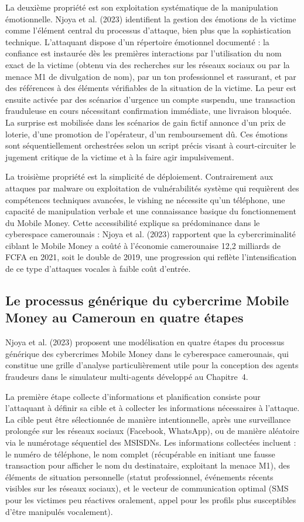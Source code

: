 \documentclass[11pt,a4paper,oneside]{report}
\theoremstyle{definition}
\theoremstyle{remark}
\begin{document}
La deuxième propriété est son exploitation systématique de la manipulation émotionnelle. Njoya et al. (2023) identifient la gestion des émotions de la victime comme l'élément central du processus d'attaque, bien plus que la sophistication technique. L'attaquant dispose d'un répertoire émotionnel documenté : la confiance est instaurée dès les premières interactions par l'utilisation du nom exact de la victime (obtenu via des recherches sur les réseaux sociaux ou par la menace M1 de divulgation de nom), par un ton professionnel et rassurant, et par des références à des éléments vérifiables de la situation de la victime. La peur est ensuite activée par des scénarios d'urgence  un compte suspendu, une transaction frauduleuse en cours nécessitant confirmation immédiate, une livraison bloquée. La surprise est mobilisée dans les scénarios de gain fictif  annonce d'un prix de loterie, d'une promotion de l'opérateur, d'un remboursement dû. Ces émotions sont séquentiellement orchestrées selon un script précis visant à court-circuiter le jugement critique de la victime et à la faire agir impulsivement.

La troisième propriété est la simplicité de déploiement. Contrairement aux attaques par malware ou exploitation de vulnérabilités système qui requièrent des compétences techniques avancées, le vishing ne nécessite qu'un téléphone, une capacité de manipulation verbale et une connaissance basique du fonctionnement du Mobile Money. Cette accessibilité explique sa prédominance dans le cyberespace camerounais : Njoya et al. (2023) rapportent que la cybercriminalité ciblant le Mobile Money a coûté à l'économie camerounaise 12,2 milliards de FCFA en 2021, soit le double de 2019, une progression qui reflète l'intensification de ce type d'attaques vocales à faible coût d'entrée.

\subsection{Le processus générique du cybercrime Mobile Money au Cameroun en quatre étapes}

Njoya et al. (2023) proposent une modélisation en quatre étapes du processus générique des cybercrimes Mobile Money dans le cyberespace camerounais, qui constitue une grille d'analyse particulièrement utile pour la conception des agents fraudeurs dans le simulateur multi-agents développé au Chapitre~4.

La première étape  collecte d'informations et planification  consiste pour l'attaquant à définir sa cible et à collecter les informations nécessaires à l'attaque. La cible peut être sélectionnée de manière intentionnelle, après une surveillance prolongée sur les réseaux sociaux (Facebook, WhatsApp), ou de manière aléatoire via le numérotage séquentiel des MSISDNs. Les informations collectées incluent : le numéro de téléphone, le nom complet (récupérable en initiant une fausse transaction pour afficher le nom du destinataire, exploitant la menace M1), des éléments de situation personnelle (statut professionnel, événements récents visibles sur les réseaux sociaux), et le vecteur de communication optimal (SMS pour les victimes peu réactives oralement, appel pour les profils plus susceptibles d'être manipulés vocalement).
\end{document}
